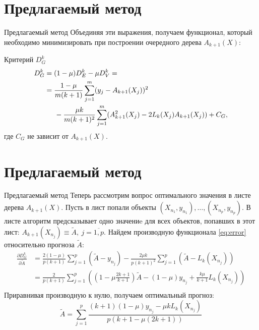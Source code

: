 \documentclass[10pt,pdf,hyperref={unicode}]{beamer}
\begin{document}
\section{Предлагаемый метод}
\begin{frame}{Предлагаемый метод}
Объединяя эти выражения, получаем функционал, который необходимо минимизировать при построении очередного дерева $A_{k+1}(X)$:
\begin{block}{Критерий $D_G^k$}
\begin{align} \label{eq:error}
  D_G^k &= (1 - \mu) D_E^k - \mu D_V^k = \\\
  &= \frac{1-\mu}{m(k+1)} \sum_{j=1}^{m}(y_j - A_{k+1}(X_j))^2 \notag \\
  &\text{\hspace{0.5cm}}-\frac{\mu k}{m(k+1)^2} \sum_{j=1}^{m} (A_{k+1}^2(X_j) - 2L_k(X_j)A_{k+1}(X_j)) + C_G, \notag
\end{align} 
где $C_G$ не зависит от $A_{k+1}(X)$.
\end{block}
\end{frame}

\section{Предлагаемый метод}
\begin{frame}{Предлагаемый метод}
    Теперь рассмотрим вопрос оптимального значения в листе дерева $A_{k+1}(X)$. Пусть в лист попали объекты $(X_{n_1}, y_{n_1}), \dots, (X_{n_p}, y_{n_p})$. В листе алгоритм предсказывает одно значениe для всех объектов, попавших в этот лист: $A_{k+1}(X_{n_j}) \equiv \tilde{A}, \ j = \overline{1, p}$.
    Найдем производную функционала \eqref{eq:error} относительно прогноза $\tilde{A}$:
    \begin{align*}
    \frac{\partial D_G^k}{\partial \tilde{A}} &= \frac{2(1-\mu)}{p(k+1)} \sum_{j=1}^{p}(\tilde{A} - y_{n_j}) -
    \frac{2\mu k}{p(k+1)^2} \sum_{j=1}^{p}(\tilde{A} - L_k(X_{n_j})) \\
    &= \frac{2}{p(k+1)} \sum_{j=1}^{p} \left((1 - \mu \frac{2k + 1}{k+1})\tilde{A}
    - (1 - \mu)y_{n_j} + \frac{k \mu}{k+1}L_k(X_{n_j}) \right) \\
    \end{align*}
    Приравнивая производную к нулю, получаем оптимальный прогноз:
    \begin{equation} \label{eq:optim_value}
    \tilde{A} = \sum_{j=1}^{p} \frac{(k+1)(1-\mu)y_{n_j} -\mu k L_k(X_{n_j})}{p(k + 1 - \mu (2k + 1))}
    \end{equation}
\end{frame}
\end{document}
